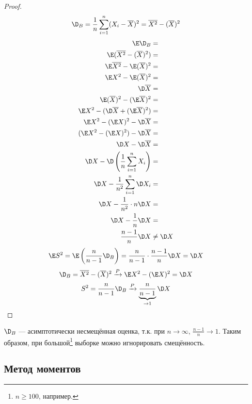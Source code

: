 \begin{proof}
    \[\D_B = \frac{1}{n} \sum_{i=1}^{n} (X_i - \overline{X})^2 = \overline{X^2} - (\overline{X})^2\]
    \begin{align*}
        \E \D_B                                                 & =         \\ \E (\overline{X^2} - (\overline{X})^2) & = \\ \E \overline{X^2} - \E (\overline{X})^2 & = \\ \E X^2 - \E (\overline{X})^2 & = \\ \D \overline{X} & = \\ \E (\overline{X})^2 - (\E \overline{X})^2 & = \\
        \E X^2 - (\D \overline{X} + (\E \overline{X})^2)        & =         \\
        \E X^2 - (\E X)^2 - \D \overline{X}                     & =         \\
        (\E X^2 - (\E X)^2) - \D \overline{X}                   & =         \\
        \D X - \D \overline{X}                                  & =         \\
        \D X - \D \left( \frac{1}{n} \sum_{i=1}^{n} X_i \right) & =         \\
        \D X - \frac{1}{n^2} \sum_{i=1}^{n} \D X_i              & =         \\
        \D X - \frac{1}{n^2} \cdot n \D X                       & =         \\
        \D X - \frac{1}{n} \D X                                 & =         \\
        \frac{n - 1}{n} \D X                                    & \neq \D X
    \end{align*}
    \[\E S^2 = \E \left( \frac{n}{n -1} \D_B \right) = \frac{n}{n - 1} \cdot \frac{n - 1}{n} \D X = \D X\]
    \[\D_B = \overline{X^2} - (\overline{X})^2 \xrightarrow[]{P} \E X^2 - (\E X)^2 = \D X\]
    \[S^2 = \frac{n}{n - 1} \D_B \xrightarrow[]{P} \underbrace{\frac{n}{n - 1}}_{ \to 1} \D X\]
\end{proof}

\begin{remark}
    \(\D_B\) --- асимптотически несмещённая оценка, т.к. при \(n \to \infty\), \(\frac{n - 1}{n} \to 1\). Таким образом, при большой\footnote{\(n \geq 100\), например.} выборке можно игнорировать смещённость.
\end{remark}

\subsection{Метод моментов}

